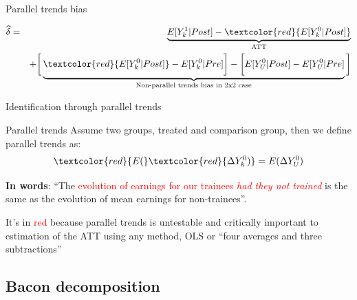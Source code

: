 \documentclass{beamer}
\begin{document}
\begin{frame}{Parallel trends bias}

\begin{eqnarray*}
\widehat{\delta} &=& \underbrace{E[Y^1_k | Post] - \textcolor{red}{E[Y^0_k | Post]}}_{\mathclap{\text{ATT}}} \\
&& + \bigg [  \underbrace{\textcolor{red}{E[Y^0_k | Post]} - E[Y^0_k | Pre] \bigg ] - \bigg [ E[Y^0_U | Post] - E[Y_U^0 | Pre] }_{\mathclap{\text{Non-parallel trends bias in 2x2 case}}} \bigg ]
\end{eqnarray*}


\end{frame}

\begin{frame}{Identification through parallel trends}
	

	\begin{block}{Parallel trends}
	Assume two groups, treated and comparison group, then we define parallel trends as:	 $$\textcolor{red}{E(}\textcolor{red}{\Delta Y^0_k)} = E(\Delta Y^0_U)$$
	\end{block}

\textbf{In words}: ``The \textcolor{red}{evolution of earnings for our trainees \emph{had they not trained}} is the same as the evolution of mean earnings for non-trainees''.  

\bigskip

It's in \textcolor{red}{red} because parallel trends is untestable and critically important to estimation of the ATT using any method, OLS or ``four averages and three subtractions''

	

	
\end{frame}














\subsection{Bacon decomposition}
\end{document}
